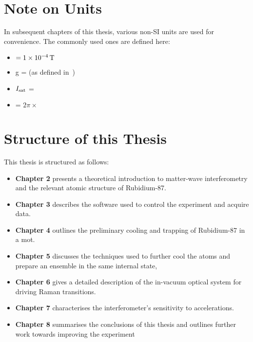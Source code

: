 \section{Note on Units}

In subsequent chapters of this thesis, various non-SI units are used
for convenience. The commonly used ones are defined here:
\begin{itemize}
  \item {} \(= \sivalue{1e-4}{\tesla}\)
    \item g =  (as defined
      in~\cite{accelStandard})
    \item $I_\textnormal{sat}$ = 
    \item \Gamma = $2\pi \times$  
  \end{itemize}
\section{Structure of this Thesis}
This thesis is structured as follows:
\begin{itemize}
  \item \textbf{Chapter 2} presents a theoretical introduction to
    matter-wave interferometry and the relevant atomic structure of
    Rubidium-87.
  \item \textbf{Chapter 3} describes the software used to control the
    experiment and acquire data.
  \item \textbf{Chapter 4} outlines the preliminary cooling and
    trapping of Rubidium-87 in a \ac{mot}.
  \item \textbf{Chapter 5} discusses the techniques used to further
    cool the atoms and prepare an ensemble in the same internal state,
  \item \textbf{Chapter 6} gives a detailed description of the
    in-vacuum optical system for driving Raman transitions.
  \item \textbf{Chapter 7} characterises the interferometer's
    sensitivity to accelerations.
  \item \textbf{Chapter 8} summarises the conclusions of this thesis and outlines
    further work towards improving the experiment
\end{itemize}



